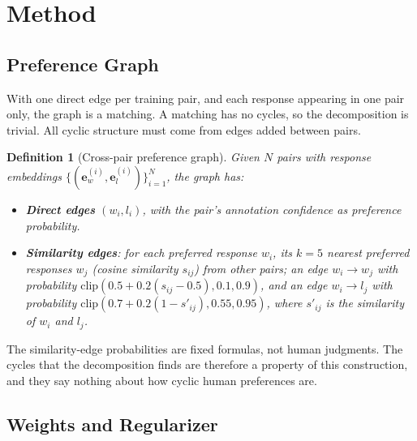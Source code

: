 \documentclass{article}
\newtheorem{definition}{Definition}
\begin{document}
\section{Method}
\label{sec:method}

\subsection{Preference Graph}
\label{sec:graph_construction}

With one direct edge per training pair, and each response appearing in one pair only, the graph is a matching. A matching has no cycles, so the decomposition is trivial. All cyclic structure must come from edges added between pairs.

\begin{definition}[Cross-pair preference graph]
Given $N$ pairs with response embeddings $\{(\mathbf{e}_w^{(i)}, \mathbf{e}_l^{(i)})\}_{i=1}^N$, the graph has:
\begin{itemize}
    \item \textbf{Direct edges} $(w_i, l_i)$, with the pair's annotation confidence as preference probability.
    \item \textbf{Similarity edges}: for each preferred response $w_i$, its $k = 5$ nearest preferred responses $w_j$ (cosine similarity $s_{ij}$) from other pairs; an edge $w_i \to w_j$ with probability $\mathrm{clip}(0.5 + 0.2(s_{ij} - 0.5), 0.1, 0.9)$, and an edge $w_i \to l_j$ with probability $\mathrm{clip}(0.7 + 0.2(1 - s'_{ij}), 0.55, 0.95)$, where $s'_{ij}$ is the similarity of $w_i$ and $l_j$.
\end{itemize}
\end{definition}

The similarity-edge probabilities are fixed formulas, not human judgments. The cycles that the decomposition finds are therefore a property of this construction, and they say nothing about how cyclic human preferences are.

\subsection{Weights and Regularizer}
\label{sec:potential_alignment}
\end{document}
